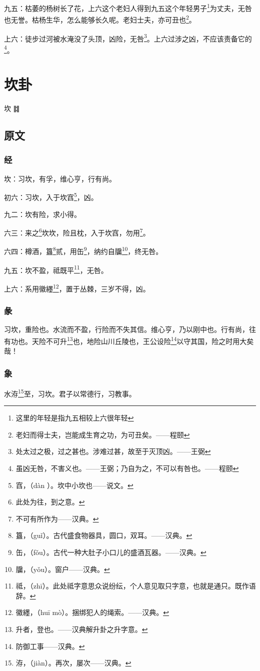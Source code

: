 \documentclass[12pt,oneside]{book}
\begin{document}
九五：枯萎的杨树长了花，上六这个老妇人得到九五这个年轻男子\footnote{这里的年轻是指九五相较上六很年轻}为丈夫，无咎也无誉。枯杨生华，怎么能够长久呢。老妇士夫，亦可丑也\footnote{老妇而得士夫，岂能成生育之功，为可丑矣。——程颐}。

上六：徒步过河被水淹没了头顶，凶险，无咎\footnote{处太过之极，过之甚也。涉难过甚，故至于灭顶凶。——王弼}。上六过涉之凶，不应该责备它的\footnote{虽凶无咎，不害义也。——王弼；乃自为之，不可以有咎也。——程颐}。


\chapter{坎卦}
坎 {\Large ䷜}

\section{原文}

\subsection{经}
坎：习坎，有孚，维心亨，行有尚。

初六：习坎，入于坎窞\footnote{窞，（dàn ）。坎中小坎也——说文。}，凶。

九二：坎有险，求小得。

六三：来之\footnote{此处为往，到之意。}坎坎，险且枕，入于坎窞，勿用\footnote{不可有所作为——汉典。}。

六四：樽酒，簋\footnote{簋，（guǐ）。古代盛食物器具，圆口，双耳。——汉典。}贰，用缶\footnote{缶，（fǒu）。古代一种大肚子小口儿的盛酒瓦器。——汉典。}，纳约自牖\footnote{牖，（yǒu）。窗户——汉典。}，终无咎。

九五：坎不盈，祗既平\footnote{祗，（zhī）。此处祗字意思众说纷纭，个人意见取只字意，也就是通只。既作语辞。}，无咎。

上六：系用徽纆\footnote{徽纆，（huī mò）。捆绑犯人的绳索。——汉典。}，置于丛棘，三岁不得，凶。

\subsection{彖}
习坎，重险也。水流而不盈，行险而不失其信。维心亨，乃以刚中也。行有尚，往有功也。天险不可升\footnote{升者，登也。——汉典解升卦之升字意。}也，地险山川丘陵也，王公设险\footnote{防御工事——汉典。}以守其国，险之时用大矣哉！

\subsection{象}
水洊\footnote{洊，（jiàn）。再次，屡次——汉典。}至，习坎。君子以常德行，习教事。
\end{document}

